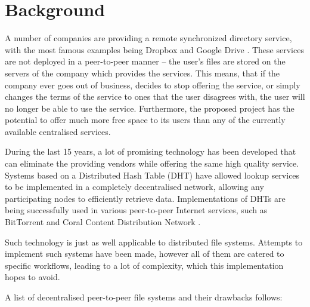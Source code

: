 \documentclass[8pt,a4paper]{article}
\begin{document}
\section{Background}

A number of companies are providing a remote synchronized directory service, with the most famous examples being Dropbox \cite{dropbox} and Google Drive \cite{gdrive}. These services are not deployed in a peer-to-peer manner -- the user's files are stored on the servers of the company which provides the services. This means, that if the company ever goes out of business, decides to stop offering the service, or simply changes the terms of the service to ones that the user disagrees with, the user will no longer be able to use the service. 
Furthermore, the proposed project has the potential to offer much more free space to its users than any of the currently available centralised services.

During the last 15 years, a lot of promising technology has been developed that can eliminate the providing vendors while offering the same high quality service. 
Systems based on a Distributed Hash Table (DHT) have allowed lookup services to be implemented in a completely decentralised network, allowing any participating nodes to efficiently retrieve data. Implementations of DHTs are being successfully used in various peer-to-peer Internet services, such as BitTorrent and Coral Content Distribution Network \cite{coral}.

Such technology is just as well applicable to distributed file systems. Attempts to implement such systems have been made, however all of them are catered to specific workflows, leading to a lot of complexity, which this implementation hopes to avoid.

A list of decentralised peer-to-peer file systems and their drawbacks follows:
\end{document}
